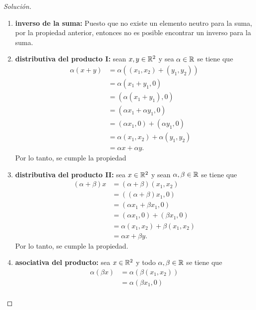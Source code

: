 \documentclass[a4,11pt]{aleph-notas}
\begin{document}
\begin{proof}[Solución]
\begin{enumerate}
    \item \textbf{inverso de la suma:}
        Puesto que no existe un elemento neutro para la suma, por la propiedad anterior, entonces no es posible encontrar un inverso para la suma. 
    \item \textbf{distributiva del producto I:}
        sean $x,y\in \mathbb{R}^2$ y sea $\alpha\in \mathbb{R}$ se tiene que
        \begin{align*}
            \alpha (x+y) & = \alpha ((x_1,x_2)+(y_1,y_2)) \\
            & = \alpha (x_1+y_1,0)\\
            & = (\alpha(x_1+y_1),0) \\
            & = (\alpha x_1 + \alpha y_1,0)\\
            & = (\alpha x_1,0) + (\alpha y_1,0)\\
            & = \alpha(x_1,x_2) + \alpha (y_1,y_2)\\
            & = \alpha x + \alpha y.
        \end{align*}
        Por lo tanto, se cumple la propiedad
    \item \textbf{distributiva del producto II:}
        sea $x\in \mathbb{R}^2$ y sean $\alpha,\beta\in \mathbb{R}$ se tiene que
        \begin{align*}
            (\alpha + \beta) x & = (\alpha + \beta) (x_1,x_2)\\
            & = ((\alpha + \beta) x_1,0)\\
            & = (\alpha x_1 + \beta x_1,0)\\
            & = (\alpha x_1,0) + (\beta x_1,0)\\
            & = \alpha(x_1,x_2) + \beta (x_1,x_2)\\
            & = \alpha x + \beta y.
        \end{align*}
        Por lo tanto, se cumple la propiedad.
    \item \textbf{asociativa del producto:}
        sea $x\in \mathbb{R}^2$ y todo $\alpha,\beta\in \mathbb{R}$ se tiene que
        \begin{align*}
            \alpha (\beta x) & = \alpha (\beta (x_1,x_2)) \\
                & = \alpha (\beta x_1,0)\\

\end{align*}
\end{enumerate}
\end{proof}
\end{document}
